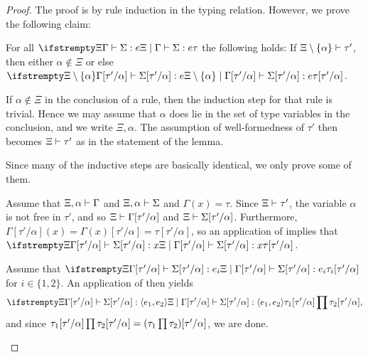 \begin{proof}
The proof is by rule induction in the typing relation. However, we prove the following claim:
%
\begin{displaytheorem}
    For all $\typerel{\Xi}{\Gamma}{\Sigma}{e}{\tau}$ the following holds: If $\Xi \setminus \{\alpha\} \vdash \tau'$, then either $\alpha \not\in \Xi$ or else $\typerel{\Xi \setminus \{\alpha\}}{\Gamma[\tau'/\alpha]}{\Sigma[\tau'/\alpha]}{e}{\tau[\tau'/\alpha]}$.
\end{displaytheorem}
%
If $\alpha \not\in \Xi$ in the conclusion of a rule, then the induction step for that rule is trivial. Hence we may assume that $\alpha$ does lie in the set of type variables in the conclusion, and we write $\Xi,\alpha$. The assumption of well-formedness of $\tau'$ then becomes $\Xi \vdash \tau'$ as in the statement of the lemma.

Since many of the inductive steps are basically identical, we only prove some of them.
%
\begin{proofsec}
    \item[\ruleref{Tvar}]
    Assume that $\Xi,\alpha \vdash \Gamma$ and $\Xi,\alpha \vdash \Sigma$ and $\Gamma(x) = \tau$. Since $\Xi \vdash \tau'$, the variable $\alpha$ is not free in $\tau'$, and so $\Xi \vdash \Gamma[\tau'/\alpha]$ and $\Xi \vdash \Sigma[\tau'/\alpha]$. Furthermore, $\Gamma[\tau'/\alpha](x) = \Gamma(x)[\tau'/\alpha] = \tau[\tau'/\alpha]$, so an application of  implies that $\typerel{\Xi}{\Gamma[\tau'/\alpha]}{\Sigma[\tau'/\alpha]}{x}{\tau[\tau'/\alpha]}$.

    \item[\ruleref{Tpair}]
    Assume that $\typerel{\Xi}{\Gamma[\tau'/\alpha]}{\Sigma[\tau'/\alpha]}{e_i}{\tau_i[\tau'/\alpha]}$ for $i \in \{1,2\}$. An application of  then yields
    \begin{equation*}
        \typerel{\Xi}{\Gamma[\tau'/\alpha]}{\Sigma[\tau'/\alpha]}{\expPair{e_1}{e_2}}{\typeProd{\tau_1[\tau'/\alpha]}{\tau_2[\tau'/\alpha]}},
    \end{equation*}
    and since $\typeProd{\tau_1[\tau'/\alpha]}{\tau_2[\tau'/\alpha]} = \typeProd*{\tau_1}{\tau_2}[\tau'/\alpha]$, we are done.


\end{proofsec}
\end{proof}
